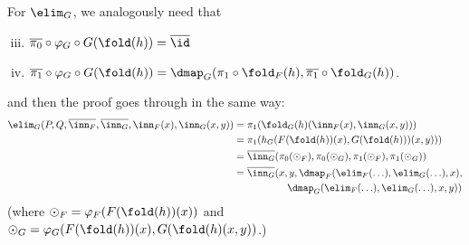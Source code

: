 \documentclass{article}
\begin{document}
For $\elim_G$, we analogously need that
\begin{enumerate}[(i)]
\setcounter{enumi}{2}
  \item $\overline{\pi_0} \circ \varphi_G \circ G(\fold(h)) = \overline{\id}$ \label{comprule3}
  \item $\overline{\pi_1} \circ \varphi_G \circ G(\fold(h)) =
    \dmap_G(\pi_1\circ\fold_F(h), \overline{\pi_1} \circ
    \fold_G(h))$. \label{comprule4}
\end{enumerate}
and then the proof goes through in the same way:
\begin{align*}
  \elim_G(P, Q, \overline{\inn_F}, \overline{\inn_G}, \inn_F(x), \inn_G(x, y))
  &= \pi_1(\fold_G(h)(\inn_F(x), \inn_G(x, y))) \\
  &= \pi_1(h_G(F(\fold(h))(x), G(\fold(h)))(x, y))) \\
  &= \overline{\inn_G}(\pi_0(\odot_F), \pi_0(\odot_G),\pi_1(\odot_F), \pi_1(\odot_G)) \\
  &= \overline{\inn_G}(x, y, \dmap_F(\elim_F(\ldots), \elim_G(\ldots), x), \\
  & \qquad\qquad\quad\  \dmap_G(\elim_F(\ldots), \elim_G(\ldots), x, y))
\end{align*}
(where $\odot_F = \varphi_F(F(\fold(h))(x))$ and $\odot_G =
\varphi_G(F(\fold(h))(x), G(\fold(h)(x, y))$.)
\end{document}
